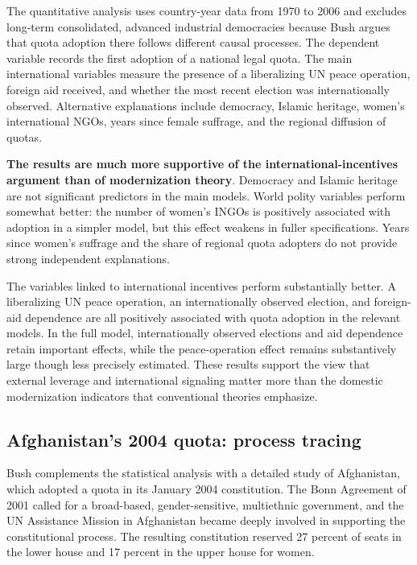 The quantitative analysis uses country-year data from 1970 to 2006 and excludes long-term consolidated, advanced industrial democracies because Bush argues that quota adoption there follows different causal processes. The dependent variable records the first adoption of a national legal quota. The main international variables measure the presence of a liberalizing UN peace operation, foreign aid received, and whether the most recent election was internationally observed. Alternative explanations include democracy, Islamic heritage, women's international NGOs, years since female suffrage, and the regional diffusion of quotas.

\textbf{The results are much more supportive of the international-incentives argument than of modernization theory}. Democracy and Islamic heritage are not significant predictors in the main models. World polity variables perform somewhat better: the number of women's INGOs is positively associated with adoption in a simpler model, but this effect weakens in fuller specifications. Years since women's suffrage and the share of regional quota adopters do not provide strong independent explanations.

The variables linked to international incentives perform substantially better. A liberalizing UN peace operation, an internationally observed election, and foreign-aid dependence are all positively associated with quota adoption in the relevant models. In the full model, internationally observed elections and aid dependence retain important effects, while the peace-operation effect remains substantively large though less precisely estimated. These results support the view that external leverage and international signaling matter more than the domestic modernization indicators that conventional theories emphasize.

\subsection{Afghanistan's 2004 quota: process tracing}

Bush complements the statistical analysis with a detailed study of Afghanistan, which adopted a quota in its January 2004 constitution. The Bonn Agreement of 2001 called for a broad-based, gender-sensitive, multiethnic government, and the UN Assistance Mission in Afghanistan became deeply involved in supporting the constitutional process. The resulting constitution reserved 27 percent of seats in the lower house and 17 percent in the upper house for women.

